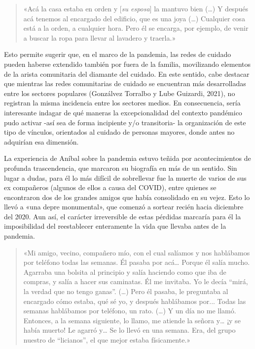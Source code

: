 \begin{quote}
«Acá la casa estaba en orden y {[}\emph{su esposa}{]} la mantuvo bien (\ldots) Y después acá tenemos al encargado del edificio, que es una joya (\ldots) Cualquier cosa está a la orden, a cualquier hora. Pero él se encarga, por ejemplo, de venir a buscar la ropa para llevar al lavadero y traerla.»
\end{quote}

Esto permite sugerir que, en el marco de la pandemia, las redes de cuidado pueden haberse extendido también por fuera de la familia, movilizando elementos de la arista comunitaria del diamante del cuidado. En este sentido, cabe destacar que mientras las redes comunitarias de cuidado se encuentran más desarrolladas entre los sectores populares (Gonzálvez Torralbo y Lube Guizardi, 2021), no registran la misma incidencia entre los sectores medios. En consecuencia, sería interesante indagar de qué maneras la excepcionalidad del contexto pandémico pudo activar -así sea de forma incipiente y/o transitoria- la organización de este tipo de vínculos, orientados al cuidado de personas mayores, donde antes no adquirían esa dimensión.

La experiencia de Aníbal sobre la pandemia estuvo teñida por acontecimientos de profunda trascendencia, que marcaron su biografía en más de un sentido. Sin lugar a dudas, para él lo más difícil de sobrellevar fue la muerte de varios de sus ex compañeros (algunos de ellos a causa del COVID), entre quienes se encontraron dos de los grandes amigos que había consolidado en su vejez. Esto lo llevó a «una depre monumental», que comenzó a sortear recién hacia diciembre del 2020. Aun así, el carácter irreversible de estas pérdidas marcaría para él la imposibilidad del reestablecer enteramente la vida que llevaba antes de la pandemia.

\begin{quote}
«Mi amigo, vecino, compañero mío, con el cual salíamos y nos hablábamos por teléfono todas las semanas. Él pasaba por acá\ldots{} Porque él salía mucho. Agarraba una bolsita al principio y salía haciendo como que iba de compras, y salía a hacer sus caminatas. Él me invitaba. Yo le decía ``mirá, la verdad que no tengo ganas''. (\ldots) Pero él pasaba, le preguntaba al encargado cómo estaba, qué sé yo, y después hablábamos por... Todas las semanas hablábamos por teléfono, un rato. (\ldots) Y un día no me llamó. Entonces, a la semana siguiente, lo llamo, me atiende la señora y\ldots{} ¡y se había muerto! Le agarró y\ldots{} Se lo llevó en una semana. Era, del grupo nuestro de ``licianos'', el que mejor estaba físicamente.»
\end{quote}


